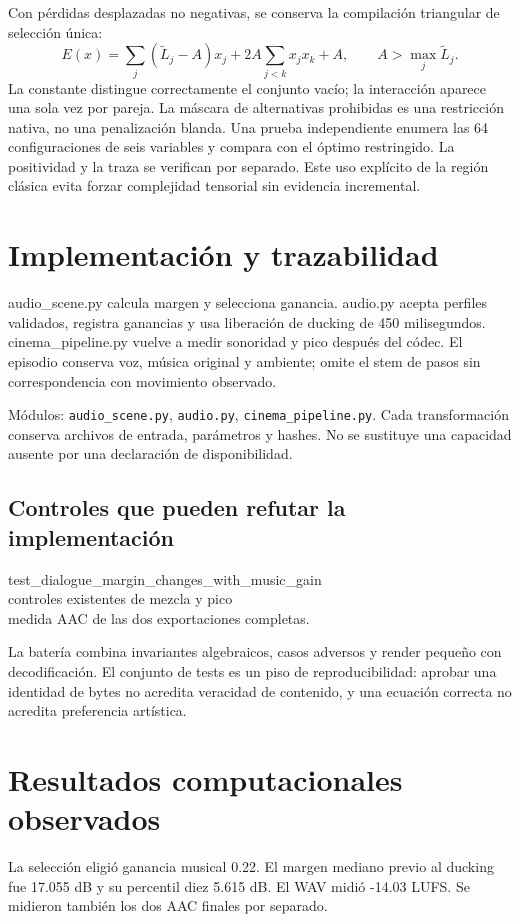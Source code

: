 \documentclass[10pt,a4paper]{article}
\begin{document}
Con pérdidas desplazadas no negativas, se conserva la compilación triangular de selección única:
\begin{equation}
E(x)=\sum_j(\widetilde L_j-A)x_j+2A\sum_{j<k}x_jx_k+A,\qquad A>\max_j\widetilde L_j.
\end{equation}
La constante distingue correctamente el conjunto vacío; la interacción aparece una sola vez por pareja. La máscara de alternativas prohibidas es una restricción nativa, no una penalización blanda. Una prueba independiente enumera las 64 configuraciones de seis variables y compara con el óptimo restringido. La positividad y la traza se verifican por separado. Este uso explícito de la región clásica evita forzar complejidad tensorial sin evidencia incremental.
\section{Implementación y trazabilidad}
audio\_\allowbreak{}scene.py calcula margen y selecciona ganancia. audio.py acepta perfiles validados, registra ganancias y usa liberación de ducking de 450 milisegundos. cinema\_\allowbreak{}pipeline.py vuelve a medir sonoridad y pico después del códec. El episodio conserva voz, música original y ambiente; omite el stem de pasos sin correspondencia con movimiento observado.

Módulos: \texttt{audio\_\allowbreak{}scene.py}, \texttt{audio.py}, \texttt{cinema\_\allowbreak{}pipeline.py}. Cada transformación conserva archivos de entrada, parámetros y hashes. No se sustituye una capacidad ausente por una declaración de disponibilidad.
\subsection{Controles que pueden refutar la implementación}
\begin{flushleft}\small test\_\allowbreak{}dialogue\_\allowbreak{}margin\_\allowbreak{}changes\_\allowbreak{}with\_\allowbreak{}music\_\allowbreak{}gain\\ controles existentes de mezcla y pico\\ medida AAC de las dos exportaciones completas.\end{flushleft}

La batería combina invariantes algebraicos, casos adversos y render pequeño con decodificación. El conjunto de tests es un piso de reproducibilidad: aprobar una identidad de bytes no acredita veracidad de contenido, y una ecuación correcta no acredita preferencia artística.
\section{Resultados computacionales observados}
La selección eligió ganancia musical 0.22. El margen mediano previo al ducking fue 17.055 dB y su percentil diez 5.615 dB. El WAV midió -14.03 LUFS. Se midieron también los dos AAC finales por separado.
\end{document}
